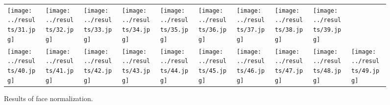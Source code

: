 \begin{figure}[hbt]
\begin{tabular}{ l l l l l l l l l l }
  \texttt{[image: ../results/31.jpg]} &
  \texttt{[image: ../results/32.jpg]} &
  \texttt{[image: ../results/33.jpg]} &
  \texttt{[image: ../results/34.jpg]} &
  \texttt{[image: ../results/35.jpg]} &
  \texttt{[image: ../results/36.jpg]} &
  \texttt{[image: ../results/37.jpg]} &
  \texttt{[image: ../results/38.jpg]} &
  \texttt{[image: ../results/39.jpg]} \\ 
  \texttt{[image: ../results/40.jpg]} &
  \texttt{[image: ../results/41.jpg]} &
  \texttt{[image: ../results/42.jpg]} &
  \texttt{[image: ../results/43.jpg]} &
  \texttt{[image: ../results/44.jpg]} &
  \texttt{[image: ../results/45.jpg]} &
  \texttt{[image: ../results/46.jpg]} &
  \texttt{[image: ../results/47.jpg]} &
  \texttt{[image: ../results/48.jpg]} &
  \texttt{[image: ../results/49.jpg]} \\ 
\end{tabular}
\caption{Results of face normalization.}
\end{figure}

